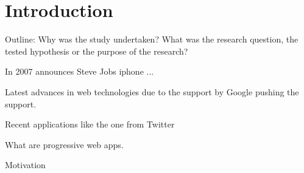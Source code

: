 \chapter{Introduction}

Outline: Why was the study undertaken?
What was the research question, the tested hypothesis or the purpose of the research?

In 2007 announces Steve Jobs iphone ...

Latest advances in web technologies due to the support by Google pushing the support.

Recent applications like the one from Twitter

What are progressive web apps.

Motivation
\cite{liebelProgressiveWebApps2019}
